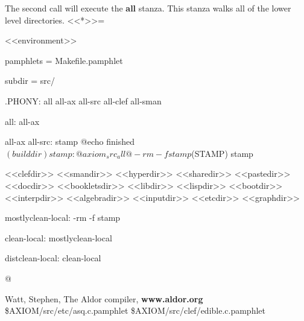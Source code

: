 \documentclass{article}
\begin{document}
The second call will execute the {\bf all} stanza. This stanza walks
all of the lower level directories.
<<*>>=

<<environment>>

pamphlets = Makefile.pamphlet

subdir = src/

.PHONY: all all-ax all-src all-clef all-sman

all: all-ax

all-ax all-src: stamp
	@echo finished $(builddir)

stamp: @axiom_src_all@
	-rm -f stamp
	$(STAMP) stamp

<<clefdir>>
<<smandir>>
<<hyperdir>>
<<sharedir>>
<<pastedir>>
<<docdir>>
<<bookletsdir>>
<<libdir>>
<<lispdir>>
<<bootdir>>
<<interpdir>>
<<algebradir>>
<<inputdir>>
<<etcdir>>
<<graphdir>>

mostlyclean-local:
	-rm -f stamp

clean-local: mostlyclean-local

distclean-local: clean-local

@
\eject
\begin{thebibliography}{99}
 Watt, Stephen, The Aldor compiler, {\bf www.aldor.org}
 \$AXIOM/src/etc/asq.c.pamphlet
 \$AXIOM/src/clef/edible.c.pamphlet
\end{thebibliography}
\end{document}
